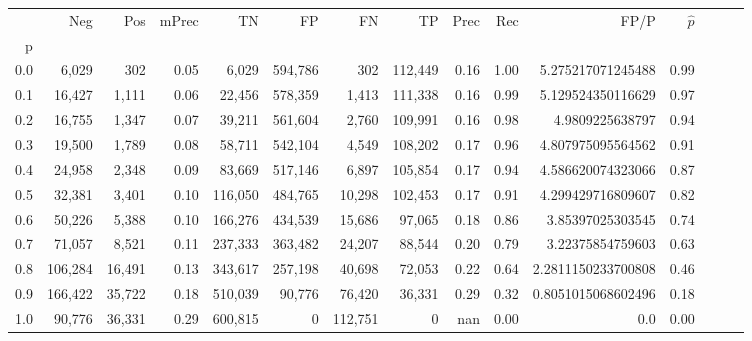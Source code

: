 \begin{tabular}{rrrrrrrrrrrrrrr}
\toprule
{} &      Neg &     Pos & mPrec &       TN &       FP &       FN &       TP &  Prec &   Rec &                FP/P & $\hat{p}$ \\
p   &          &         &       &          &          &          &          &       &       &                     &           \\
\midrule
0.0 &    6,029 &     302 &  0.05 &    6,029 &  594,786 &      302 &  112,449 &  0.16 &  1.00 &   5.275217071245488 &      0.99 \\
0.1 &   16,427 &   1,111 &  0.06 &   22,456 &  578,359 &    1,413 &  111,338 &  0.16 &  0.99 &   5.129524350116629 &      0.97 \\
0.2 &   16,755 &   1,347 &  0.07 &   39,211 &  561,604 &    2,760 &  109,991 &  0.16 &  0.98 &     4.9809225638797 &      0.94 \\
0.3 &   19,500 &   1,789 &  0.08 &   58,711 &  542,104 &    4,549 &  108,202 &  0.17 &  0.96 &   4.807975095564562 &      0.91 \\
0.4 &   24,958 &   2,348 &  0.09 &   83,669 &  517,146 &    6,897 &  105,854 &  0.17 &  0.94 &   4.586620074323066 &      0.87 \\
0.5 &   32,381 &   3,401 &  0.10 &  116,050 &  484,765 &   10,298 &  102,453 &  0.17 &  0.91 &   4.299429716809607 &      0.82 \\
0.6 &   50,226 &   5,388 &  0.10 &  166,276 &  434,539 &   15,686 &   97,065 &  0.18 &  0.86 &    3.85397025303545 &      0.74 \\
0.7 &   71,057 &   8,521 &  0.11 &  237,333 &  363,482 &   24,207 &   88,544 &  0.20 &  0.79 &    3.22375854759603 &      0.63 \\
0.8 &  106,284 &  16,491 &  0.13 &  343,617 &  257,198 &   40,698 &   72,053 &  0.22 &  0.64 &  2.2811150233700808 &      0.46 \\
0.9 &  166,422 &  35,722 &  0.18 &  510,039 &   90,776 &   76,420 &   36,331 &  0.29 &  0.32 &  0.8051015068602496 &      0.18 \\
1.0 &   90,776 &  36,331 &  0.29 &  600,815 &        0 &  112,751 &        0 &   nan &  0.00 &                 0.0 &      0.00 \\
\bottomrule
\end{tabular}
